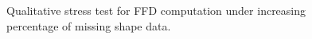 \documentclass[acmtog,timestamp]{acmart}%
\newcommand{\jsubfig}[2]{%
	\sbox\jsavebox{#1}%
	\parbox[t]{\wd\jsavebox}{\centering\usebox\jsavebox\\#2}%
	}
\begin{document}
\begin{figure}
\begin{tabular}{ c c c c c}
\end{tabular}
\caption{Qualitative stress test for FFD computation under increasing percentage of missing shape data.}
\label{fig:stress_test}
\end{figure}\begin{comment}

  \jsubfig{}{} \hspace*{1.6cm} %
    \hfill \jsubfig{\texttt{[image: figures/stress\_test/airplane/sample013\_target.png]}} \;%
    \hfill \jsubfig{\texttt{[image: figures/stress\_test/airplane/sample001\_target.png]}} \;%
	\hfill \jsubfig{\texttt{[image: figures/stress\_test/airplane/sample002\_target.png]}} \;%
    \hfill \jsubfig{\texttt{[image: figures/stress\_test/airplane/sample003\_target.png]}} \;%
    \hfill \jsubfig{\texttt{[image: figures/stress\_test/airplane/sample004\_target.png]}} \;%
    \hfill \jsubfig{\texttt{[image: figures/stress\_test/airplane/sample005\_target.png]}} \;%
    \hfill \jsubfig{\texttt{[image: figures/stress\_test/airplane/sample006\_target.png]}} \;%
    \hfill \jsubfig{\texttt{[image: figures/stress\_test/airplane/sample007\_target.png]}} \;%
    \hfill \jsubfig{\texttt{[image: figures/stress\_test/airplane/sample008\_target.png]}}{} \;%
    
    \jsubfig{\texttt{[image: \{figures/stress\_test/airplane/sample001\_source.png]}}}{} \;
    \hfill \jsubfig{\texttt{[image: figures/stress\_test/airplane/sample013\_targetPred.png]}} \; %
    \hfill \jsubfig{\texttt{[image: figures/stress\_test/airplane/sample001\_targetPred.png]}} \; %
	\hfill \jsubfig{\texttt{[image: figures/stress\_test/airplane/sample002\_targetPred.png]}} \; %
    \hfill \jsubfig{\texttt{[image: figures/stress\_test/airplane/sample003\_targetPred.png]}} \; %
    \hfill \jsubfig{\texttt{[image: figures/stress\_test/airplane/sample004\_targetPred.png]}} \; %
    \hfill \jsubfig{\texttt{[image: figures/stress\_test/airplane/sample005\_targetPred.png]}} \; %
    \hfill \jsubfig{\texttt{[image: figures/stress\_test/airplane/sample006\_targetPred.png]}} \; %
    \hfill \jsubfig{\texttt{[image: figures/stress\_test/airplane/sample007\_targetPred.png]}} \; %
    \hfill \jsubfig{\texttt{[image: figures/stress\_test/airplane/sample008\_targetPred.png]}}{} \;%
    

\end{comment}
\end{document}
